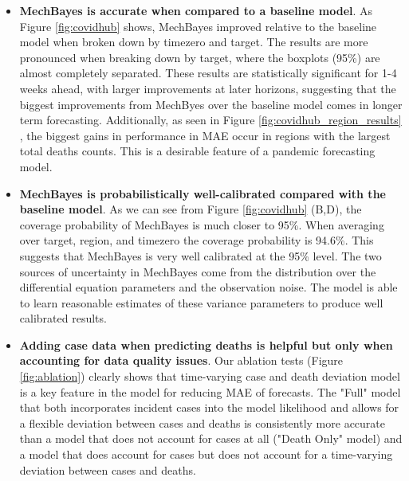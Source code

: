 \documentclass{umassthesis}          %
\begin{document}
\begin{itemize}

\item \textbf{MechBayes is accurate when compared to a baseline model}. As Figure \ref{fig:covidhub} shows, MechBayes improved relative to the baseline model when broken down by timezero and target. The results are more pronounced when breaking down by target, where the boxplots (95\%) are almost completely separated. These results are statistically significant for 1-4 weeks ahead, with larger improvements at later horizons, suggesting that the biggest improvements from MechByes over the baseline model comes in longer term forecasting. Additionally, as seen in Figure \ref{fig:covidhub_region_results} , the biggest gains in performance in MAE occur in regions with the largest total deaths counts. This is a desirable feature of a pandemic forecasting model. 

\item \textbf{MechBayes is probabilistically well-calibrated compared with the baseline model}. As we can see from Figure \ref{fig:covidhub} (B,D), the coverage probability of MechBayes is much closer to 95\%. When averaging over target, region, and timezero the coverage probability is 94.6\%. This suggests that MechBayes is very well calibrated at the 95\% level. The two sources of uncertainty in MechBayes come from the distribution over the differential equation parameters and the observation noise. The model is able to learn reasonable estimates of these variance parameters to produce well calibrated results. 


\item \textbf{Adding case data when predicting deaths is helpful but only when accounting for data quality issues}. Our ablation tests (Figure \ref{fig:ablation}) clearly shows that time-varying case and death deviation model is a key feature in the model for reducing MAE of forecasts. The "Full" model that both incorporates incident cases into the model likelihood and allows for a flexible deviation between cases and deaths is consistently more accurate than a model that does not account for cases at all ("Death Only" model) and a model that does account for cases but does not account for a time-varying deviation between cases and deaths.





\end{itemize}
\end{document}
